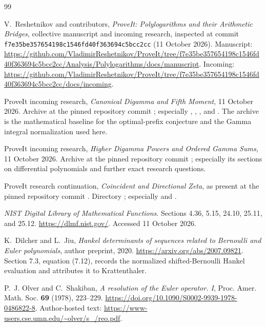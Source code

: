 \begin{thebibliography}{99}

V.~Reshetnikov and contributors,
\emph{ProveIt: Polylogarithms and their Arithmetic Bridges},
collective manuscript and incoming research, inspected at commit
\texttt{f7e35be357654198c1546fd40f363694c5bcc2cc} (11 October 2026).
Manuscript: \url{https://github.com/VladimirReshetnikov/ProveIt/tree/f7e35be357654198c1546fd40f363694c5bcc2cc/Analysis/Polylogarithms/docs/manuscript}.
Incoming: \url{https://github.com/VladimirReshetnikov/ProveIt/tree/f7e35be357654198c1546fd40f363694c5bcc2cc/docs/incoming}.

ProveIt incoming research,
\emph{Canonical Digamma and Fifth Moment}, 11 October 2026.
Archive 
at the pinned repository commit \cite{Repo}; especially
, ,
, and .
The archive is the mathematical baseline for the optimal-prefix
conjecture and the Gamma integral normalization used here.

ProveIt incoming research,
\emph{Higher Digamma Powers and Ordered Gamma Sums}, 11 October 2026.
Archive 
at the pinned repository commit \cite{Repo}; especially its sections
on differential polynomials and further exact research questions.

ProveIt research continuation,
\emph{Coincident and Directional Zeta}, as present at the pinned
repository commit \cite{Repo}.
Directory
;
especially  and .

\emph{NIST Digital Library of Mathematical Functions}.
Sections 4.36, 5.15, 24.10, 25.11, and 25.12.
\url{https://dlmf.nist.gov/}. Accessed 11 October 2026.

K.~Dilcher and L.~Jiu,
\emph{Hankel determinants of sequences related to Bernoulli and
Euler polynomials}, author preprint, 2020.
\url{https://arxiv.org/abs/2007.09821}.
Section 7.3, equation (7.12), records the normalized shifted-Bernoulli
Hankel evaluation and attributes it to Krattenthaler.

P.~J. Olver and C.~Shakiban,
\emph{A resolution of the Euler operator. I},
Proc. Amer. Math. Soc. \textbf{69} (1978), 223--229.
\url{https://doi.org/10.1090/S0002-9939-1978-0486822-8}.
Author-hosted text:
\url{https://www-users.cse.umn.edu/~olver/s_/reo.pdf}.


\end{thebibliography}
